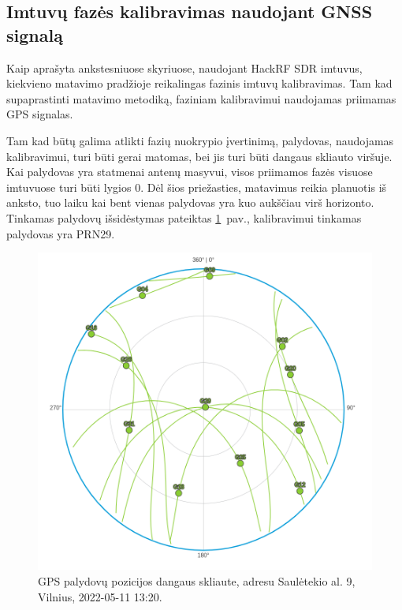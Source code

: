 \documentclass[main.tex]{subfiles}
\begin{document}
\subsection{Imtuvų fazės kalibravimas naudojant GNSS signalą}\label{sec:phase_clib_using_gnss}

Kaip aprašyta ankstesniuose skyriuose, naudojant HackRF SDR imtuvus, kiekvieno
matavimo pradžioje reikalingas fazinis imtuvų kalibravimas. Tam kad supaprastinti
matavimo metodiką, faziniam kalibravimui naudojamas priimamas GPS signalas.

Tam kad būtų galima atlikti fazių nuokrypio įvertinimą, palydovas, naudojamas kalibravimui,
turi būti gerai matomas, bei jis turi būti dangaus skliauto viršuje.
Kai palydovas yra statmenai antenų masyvui, visos priimamos fazės visuose
imtuvuose turi būti lygios 0. Dėl šios priežasties, matavimus reikia
planuotis iš anksto, tuo laiku kai bent vienas palydovas yra
kuo aukščiau virš horizonto. Tinkamas palydovų išsidėstymas
pateiktas \ref{fig:gnss_sat_pos_calibartion}~pav.,
kalibravimui tinkamas palydovas yra PRN29.

\begin{figure}[ht]
    \begin{centering}
    \includegraphics[scale=1.2]{drawings/gnss_sattelites_position}
    \par\end{centering}
    \protect\caption{\label{fig:gnss_sat_pos_calibartion}GPS palydovų pozicijos dangaus skliaute, adresu Saulėtekio al. 9, Vilnius, 2022-05-11 13:20.}
\end{figure}
\end{document}
